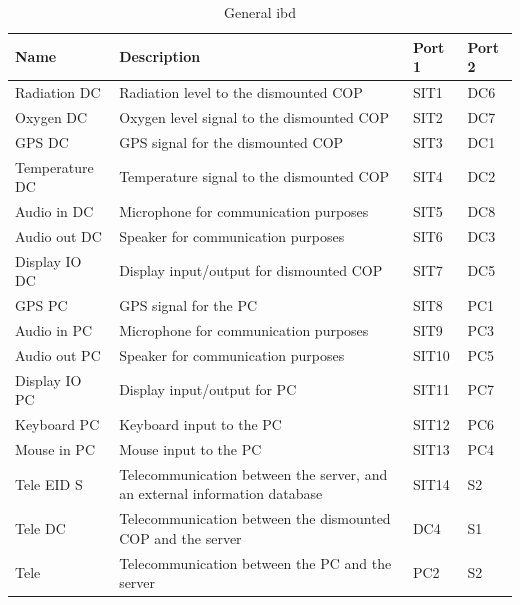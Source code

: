 \begin{table}[H]  
\centering

\begin{tabular}{|l|p{8cm}|l|l|} 
\hline
	\textbf{Name}		& \textbf{Description}						  & \textbf{Port 1} & \textbf{Port 2} \\\hline
  Radiation DC				&  Radiation level to the dismounted COP 	 					   & SIT1 & DC6 \\\hline
  Oxygen DC					&  Oxygen level signal to the dismounted COP				   & SIT2 & DC7 \\\hline
  GPS DC					&  GPS signal for the dismounted COP 	 					   & SIT3 & DC1 \\\hline   
  Temperature DC			&  Temperature signal to the dismounted COP 	 					   & SIT4 & DC2 \\\hline     
  Audio in DC				&  Microphone for communication purposes 	 				   & SIT5 &DC8\\\hline     
  Audio out DC				&  Speaker for communication purposes 	 					   & SIT6 & DC3 \\\hline     
  Display IO DC				&  Display input/output for dismounted COP 	 					   & SIT7 & DC5 \\\hline     
  
  GPS PC					&  GPS signal for the PC			 	 					   & SIT8 & PC1 \\\hline     
  Audio in PC				&  Microphone for communication purposes 	 					   & SIT9 & PC3 \\\hline     
  Audio out PC				&  Speaker for communication purposes 	 					   & SIT10 & PC5 \\\hline     
  Display IO PC				&  Display input/output for PC 	 					   & SIT11 & PC7 \\\hline     
  Keyboard PC				&  Keyboard input to the PC 	 					   & SIT12 & PC6 \\\hline     
  Mouse in PC				&  Mouse input to the PC 	 					   & SIT13 & PC4 \\\hline    
  Tele EID S				&  Telecommunication between the server, and an external information database				   & SIT14 & S2 \\\hline
       
  Tele DC					&  Telecommunication between the dismounted COP and the server & DC4 & S1 \\\hline   
  Tele 						&  Telecommunication between the PC and the server 					   & PC2 & S2 \\\hline   
   
\end{tabular}
\caption {General ibd} 
\end{table} 




